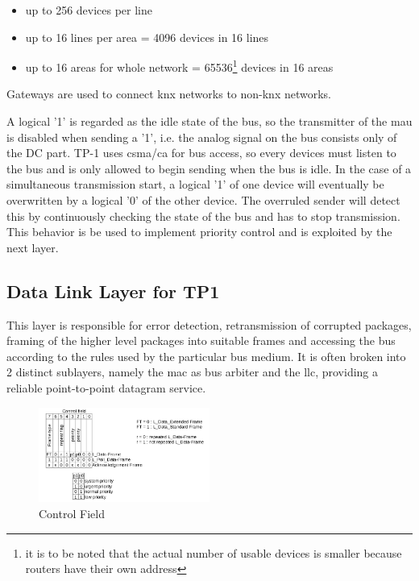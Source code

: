 \begin{itemize}
 \item up to 256 devices per line
 \item up to 16 lines per area = 4096 devices in 16 lines
 \item up to 16 areas for whole network = 65536\footnote{it is to be noted that the actual number of usable devices is smaller because routers have
 their own address} devices in 16 areas
\end{itemize}

Gateways are used to connect \gls{knx} networks to non-\gls{knx} networks.

A logical '1' is regarded as the idle state of the bus, so the transmitter of the \gls{mau} is disabled when sending a '1', i.e. the analog signal on
the bus consists only of the DC part. \gls{TP}-1 uses \gls{csma}/\gls{ca} for bus access, so every devices must listen to the bus and is only allowed
to begin sending when the bus is idle. In the case of a simultaneous transmission start, a logical '1' of one
device will eventually be overwritten by a logical '0' of the other device. The overruled
sender will detect this by continuously checking the state of the bus and has to stop 
transmission. This behavior is be used to implement priority control and is exploited by the next layer.

\subsection{Data Link Layer for TP1}

This layer is responsible for error detection, retransmission of corrupted 
packages, framing of the higher level packages into suitable frames and accessing the bus according to the rules used by the particular bus medium. 
It is often broken into 2 distinct sublayers, namely the \gls{mac} as bus arbiter and the \gls{llc}, providing a reliable point-to-point datagram service.

\begin{figure}
    \centering
    \includegraphics[width=0.5\textwidth]{figures/controlfield.png}
    \caption{Control Field}
    \label{fig:ctrlfield}
\end{figure}

